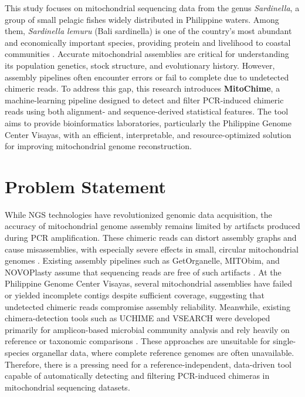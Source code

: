 This study focuses on mitochondrial sequencing data from the genus \textit{Sardinella}, a group of small pelagic fishes widely distributed in Philippine waters. Among them, \textit{Sardinella lemuru} (Bali sardinella) is one of the country’s most abundant and economically important species, providing protein and livelihood to coastal communities \citep{Willette2011,Labrador2021}. Accurate mitochondrial assemblies are critical for understanding its population genetics, stock structure, and evolutionary history. However, assembly pipelines often encounter errors or fail to complete due to undetected chimeric reads. To address this gap, this research introduces \textbf{MitoChime}, a machine-learning pipeline designed to detect and filter PCR-induced chimeric reads using both alignment- and sequence-derived statistical features. The tool aims to provide bioinformatics laboratories, particularly the Philippine Genome Center Visayas, with an efficient, interpretable, and resource-optimized solution for improving mitochondrial genome reconstruction.

\section{Problem Statement}\label{subsec:probstatement}

While NGS technologies have revolutionized genomic data acquisition, the accuracy of mitochondrial genome assembly remains limited by artifacts produced during PCR amplification. These chimeric reads can distort assembly graphs and cause misassemblies, with especially severe effects in small, circular mitochondrial genomes \citep{Boore1999,Cameron2014}. Existing assembly pipelines such as GetOrganelle, MITObim, and NOVOPlasty assume that sequencing reads are free of such artifacts \citep{Hahn2013,Dierckxsens2017,Jin2020}. At the Philippine Genome Center Visayas, several mitochondrial assemblies have failed or yielded incomplete contigs despite sufficient coverage, suggesting that undetected chimeric reads compromise assembly reliability. Meanwhile, existing chimera-detection tools such as UCHIME and VSEARCH were developed primarily for amplicon-based microbial community analysis and rely heavily on reference or taxonomic comparisons \citep{Edgar2011,Rognes2016}. These approaches are unsuitable for single-species organellar data, where complete reference genomes are often unavailable. Therefore, there is a pressing need for a reference-independent, data-driven tool capable of automatically detecting and filtering PCR-induced chimeras in mitochondrial sequencing datasets.

